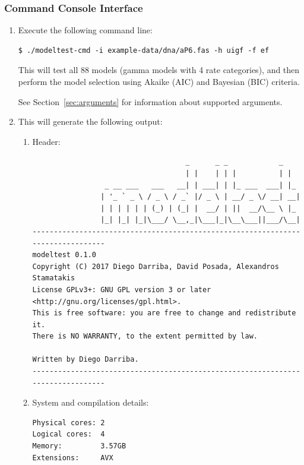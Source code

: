 \subsubsection{Command Console Interface}

\begin{enumerate}
\item Execute the following command line:

\begin{lstlisting}
$ ./modeltest-cmd -i example-data/dna/aP6.fas -h uigf -f ef
\end{lstlisting}

This will test all 88 models (gamma models with 4 rate categories), and then perform the model selection using Akaike (AIC) and Bayesian (BIC) criteria.

See Section~\ref{sec:arguments} for information about supported arguments.

\item This will generate the following output:

\begin{enumerate}

\item Header:

\begin{lstlisting}
                                    _      _ _            _
                                    | |    | | |          | |
                 _ __ ___   ___   __| | ___| | |_ ___  ___| |_
                | '_ ` _ \ / _ \ / _` |/ _ \ | __/ _ \/ __| __|
                | | | | | | (_) | (_| |  __/ | ||  __/\__ \ |_
                |_| |_| |_|\___/ \__,_|\___|_|\__\___||___/\__|
--------------------------------------------------------------------------------
modeltest 0.1.0
Copyright (C) 2017 Diego Darriba, David Posada, Alexandros Stamatakis
License GPLv3+: GNU GPL version 3 or later <http://gnu.org/licenses/gpl.html>.
This is free software: you are free to change and redistribute it.
There is NO WARRANTY, to the extent permitted by law.

Written by Diego Darriba.
--------------------------------------------------------------------------------
\end{lstlisting}

\item System and compilation details:

\begin{lstlisting}
Physical cores: 2
Logical cores:  4
Memory:         3.57GB
Extensions:     AVX


\end{lstlisting}
\end{enumerate}
\end{enumerate}
